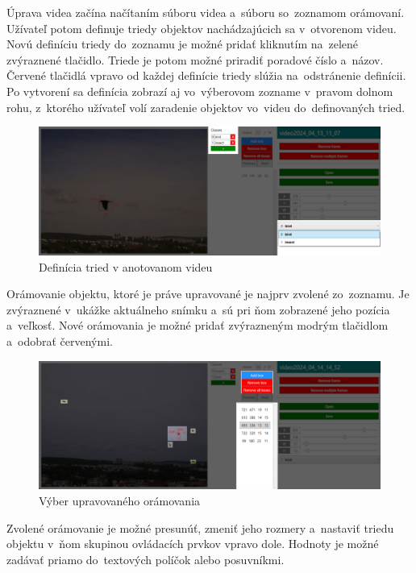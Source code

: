         Úprava videa začína načítaním súboru videa a~súboru so~zoznamom orámovaní. Užívateľ potom definuje triedy objektov nachádzajúcich sa v~otvorenom videu. Novú definíciu triedy do~zoznamu je možné pridať kliknutím na~zelené zvýraznené tlačidlo. Triede je potom možné priradiť poradové číslo a~názov. Červené tlačidlá vpravo od každej definície triedy slúžia na~odstránenie definícii. Po vytvorení sa definícia zobrazí aj vo~výberovom zozname v~pravom dolnom rohu, z~ktorého užívateľ volí zaradenie objektov vo~videu do~definovaných tried.

        \begin{figure}[H]
            \centering
            \includegraphics[width=\textwidth]{obrazky/video_annotator/class_definition.png}
            \caption{Definícia tried v anotovanom videu}
        \end{figure}

        Orámovanie objektu, ktoré je práve upravované je najprv zvolené zo~zoznamu. Je zvýraznené v~ukážke aktuálneho snímku a~sú pri ňom zobrazené jeho pozícia a~veľkosť. Nové orámovania je možné pridať zvýrazneným modrým tlačidlom a~odobrať červenými.

        \begin{figure}[H]
            \centering
            \includegraphics[width=\textwidth]{obrazky/video_annotator/bbox_select.png}
            \caption{Výber upravovaného orámovania}
        \end{figure}

        Zvolené orámovanie je možné presunúť, zmeniť jeho rozmery a~nastaviť triedu objektu v~ňom skupinou ovládacích prvkov vpravo dole. Hodnoty je možné zadávať priamo do~textových políčok alebo posuvníkmi.

